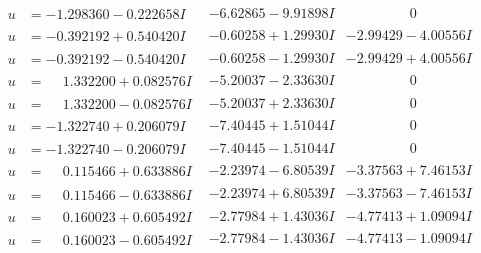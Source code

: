\documentclass[1p]{elsarticle_modified}
\theoremstyle{definition}
\begin{document}
$$\begin{array}{c|c|c}
\begin{aligned}
u &= -1.298360 - 0.222658 I\end{aligned}
 & -6.62865 - 9.91898 I & \phantom{-0.000000 } 0 \\ \hline\begin{aligned}
u &= -0.392192 + 0.540420 I\end{aligned}
 & -0.60258 + 1.29930 I & -2.99429 - 4.00556 I \\ \hline\begin{aligned}
u &= -0.392192 - 0.540420 I\end{aligned}
 & -0.60258 - 1.29930 I & -2.99429 + 4.00556 I \\ \hline\begin{aligned}
u &= \phantom{-}1.332200 + 0.082576 I\end{aligned}
 & -5.20037 - 2.33630 I & \phantom{-0.000000 } 0 \\ \hline\begin{aligned}
u &= \phantom{-}1.332200 - 0.082576 I\end{aligned}
 & -5.20037 + 2.33630 I & \phantom{-0.000000 } 0 \\ \hline\begin{aligned}
u &= -1.322740 + 0.206079 I\end{aligned}
 & -7.40445 + 1.51044 I & \phantom{-0.000000 } 0 \\ \hline\begin{aligned}
u &= -1.322740 - 0.206079 I\end{aligned}
 & -7.40445 - 1.51044 I & \phantom{-0.000000 } 0 \\ \hline\begin{aligned}
u &= \phantom{-}0.115466 + 0.633886 I\end{aligned}
 & -2.23974 - 6.80539 I & -3.37563 + 7.46153 I \\ \hline\begin{aligned}
u &= \phantom{-}0.115466 - 0.633886 I\end{aligned}
 & -2.23974 + 6.80539 I & -3.37563 - 7.46153 I \\ \hline\begin{aligned}
u &= \phantom{-}0.160023 + 0.605492 I\end{aligned}
 & -2.77984 + 1.43036 I & -4.77413 + 1.09094 I \\ \hline\begin{aligned}
u &= \phantom{-}0.160023 - 0.605492 I\end{aligned}
 & -2.77984 - 1.43036 I & -4.77413 - 1.09094 I \\ \hline\begin{aligned}

\end{aligned}
\end{array}$$
\end{document}
